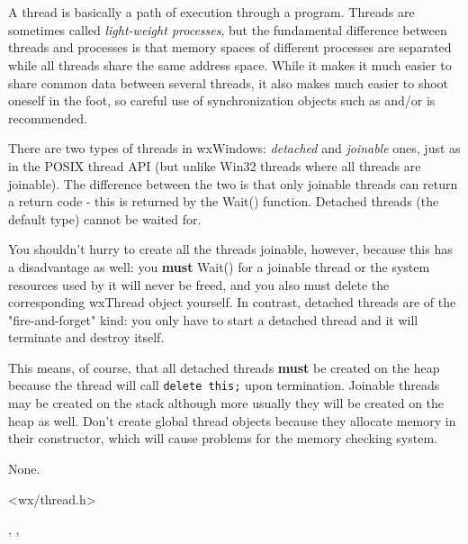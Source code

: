 \section{}\label{wxthread}

A thread is basically a path of execution through a program. Threads are
sometimes called {\it light-weight processes}, but the fundamental difference
between threads and processes is that memory spaces of different processes are
separated while all threads share the same address space. While it makes it
much easier to share common data between several threads, it also makes much
easier to shoot oneself in the foot, so careful use of synchronization objects
such as  and/or  is recommended.

There are two types of threads in wxWindows: {\it detached} and {\it joinable}
ones, just as in the POSIX thread API (but unlike Win32 threads where all threads
are joinable). The difference between the two is that only joinable threads
can return a return code - this is returned by the Wait() function. Detached
threads (the default type) cannot be waited for.

You shouldn't hurry to create all the threads joinable, however, because this
has a disadvantage as well: you {\bf must} Wait() for a joinable thread or the
system resources used by it will never be freed, and you also must delete the
corresponding wxThread object yourself. In contrast, detached threads are of the
"fire-and-forget" kind: you only have to start a detached thread and it will
terminate and destroy itself.

This means, of course, that all detached threads {\bf must} be created on the
heap because the thread will call {\tt delete this;} upon termination. Joinable
threads may be created on the stack although more usually they will be created
on the heap as well. Don't create global thread objects because they allocate
memory in their constructor, which will cause problems for the memory checking
system.


None.


<wx/thread.h>


, , 

